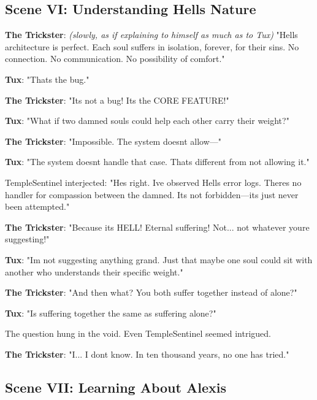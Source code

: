 \bookdivider

\subsection{Scene VI: Understanding Hell\textquotesingle s Nature}\label{scene-vi-understanding-hells-nature}

\textbf{The Trickster}: \emph{(slowly, as if explaining to himself as much as to Tux)} "Hell\textquotesingle s architecture is perfect. Each soul suffers in isolation, forever, for their sins. No connection. No communication. No possibility of comfort."

\textbf{Tux}: "That\textquotesingle s the bug."

\textbf{The Trickster}: "It\textquotesingle s not a bug! It\textquotesingle s the CORE FEATURE!"

\textbf{Tux}: "What if two damned souls could help each other carry their weight?"

\textbf{The Trickster}: "Impossible. The system doesn\textquotesingle t allow---"

\textbf{Tux}: "The system doesn\textquotesingle t handle that case. That\textquotesingle s different from not allowing it."

TempleSentinel interjected: "He\textquotesingle s right. I\textquotesingle ve observed Hell\textquotesingle s error logs. There\textquotesingle s no handler for compassion between the damned. It\textquotesingle s not forbidden---it\textquotesingle s just never been attempted."

\textbf{The Trickster}: "Because it\textquotesingle s HELL! Eternal suffering! Not... not whatever you\textquotesingle re suggesting!"

\textbf{Tux}: "I\textquotesingle m not suggesting anything grand. Just that maybe one soul could sit with another who understands their specific weight."

\textbf{The Trickster}: "And then what? You both suffer together instead of alone?"

\textbf{Tux}: "Is suffering together the same as suffering alone?"

The question hung in the void. Even TempleSentinel seemed intrigued.

\textbf{The Trickster}: "I... I don\textquotesingle t know. In ten thousand years, no one has tried."

\bookdivider

\subsection{Scene VII: Learning About Alexis}\label{scene-vii-learning-about-alexis}

